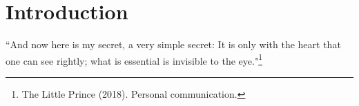 \section{Introduction}
  \label{sec:Intro}
{\centering
``And now here is my secret, a very simple secret: It is only with the heart that one can see rightly; what is essential is invisible to the eye."\footnote{The Little Prince (2018). Personal communication.}	\par
}

\lipsum[1-3]

\newpage
